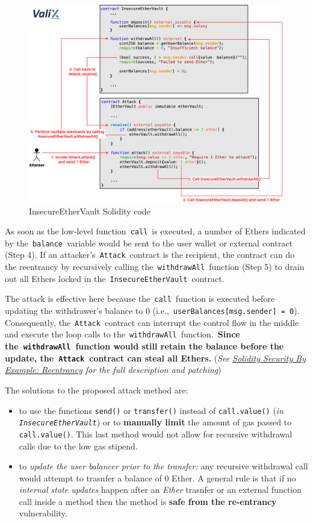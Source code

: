 \documentclass[10pt,a4paper]{report}
\begin{document}
\begin{figure}[h]
	\centering
	\includegraphics[scale=0.30]{images/Pasted image 20230427080137.png}
	\caption{InsecureEtherVault Solidity code}
\end{figure}


As soon as the low-level function \texttt{call} is executed, a number of Ethers indicated by the \texttt{balance} variable would be sent to the user wallet or external contract (Step 4). If an attacker’s \texttt{Attack} contract is the recipient, the contract can do the reentrancy by recursively calling the \texttt{withdrawAll} function (Step 5) to drain out all Ethers locked in the \texttt{InsecureEtherVault} contract. 

The attack is effective here because the \texttt{call} function is executed before updating the withdrawer’s balance to 0 (i.e., \texttt{userBalances[msg.sender] = 0}). Consequently, the \texttt{Attack} contract can interrupt the control flow in the middle and execute the loop calls to the \texttt{withdrawAll} function. \textbf{Since the \texttt{withdrawAll} function would still retain the balance before the update, the \texttt{Attack} contract can steal all Ethers.} (\textit{See \href{https://www.serial-coder.com/post/solidity-smart-contract-security-by-example-02-reentrancy/}{Solidity Security By Example: Reentrancy} for the full description and patching})

The solutions to the proposed attack method are:
\begin{itemize}
	\item 
	to use the functions \texttt{send()} or \texttt{transfer()} instead of \texttt{call.value()} (\textit{in \texttt{InsecureEtherVault}}) or to \textbf{manually limit} the amount of gas passed to \texttt{call.value()}. This last method would not allow for recursive withdrawal calls due to the low gas stipend.
	\item 
	to \textit{update the user balancer prior to the transfer:} any recursive withdrawal call would attempt to trasnfer a balance of $0$ Ether.
	A general rule is that if no \textit{internal state updates} happen after an \textit{Ether} trasnfer or an external function call inside a method then the method is \textbf{safe from the re-entrancy} vulnerability.
\end{itemize}
\end{document}
